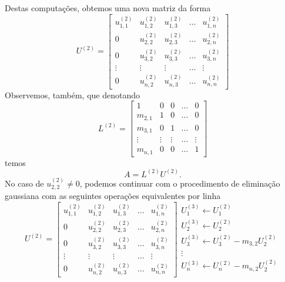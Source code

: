 Destas computações, obtemos uma nova matriz da forma
\begin{equation}
  U^{(2)} = \begin{bmatrix}
    u_{1,1}^{(2)} & u_{1,2}^{(2)} & u_{1,3}^{(2)} & \ldots & u_{1,n}^{(2)} \\
    0 & u_{2,2}^{(2)} & u_{2,3}^{(2)} & \ldots & u_{2,n}^{(2)} \\
    0 & u_{3,2}^{(2)} & u_{3,3}^{(2)} & \ldots & u_{3,n}^{(2)} \\
    \vdots & \vdots & \vdots & \ldots & \vdots \\
    0 & u_{n,2}^{(2)} & u_{n,3}^{(2)} & \ldots & u_{n,n}^{(2)}
  \end{bmatrix}  
\end{equation}
Observemos, também, que denotando
\begin{equation}
  L^{(2)} =
  \begin{bmatrix}
    1 & 0 & 0 & \ldots & 0\\
    m_{2,1} & 1 & 0 & \ldots & 0\\
    m_{3,1} & 0 & 1 & \ldots & 0\\
    \vdots & \vdots & \vdots & \ldots & \vdots\\
    m_{n,1} & 0 & 0 & \ldots & 1
  \end{bmatrix}
\end{equation}
temos
\begin{equation}
  A = L^{(2)}U^{(2)}.
\end{equation}
No caso de $u^{(2)}_{2,2}\neq 0$, podemos continuar com o procedimento de eliminação gaussiana com as seguintes operações equivalentes por linha
\begin{equation}
  U^{(2)} = \begin{bmatrix}
    u_{1,1}^{(2)} & u_{1,2}^{(2)} & u_{1,3}^{(2)} & \ldots & u_{1,n}^{(2)} \\
    0 & u_{2,2}^{(2)} & u_{2,3}^{(2)} & \ldots & u_{2,n}^{(2)} \\
    0 & u_{3,2}^{(2)} & u_{3,3}^{(2)} & \ldots & u_{3,n}^{(2)} \\
    \vdots & \vdots & \vdots & \ldots & \vdots \\
    0 & u_{n,2}^{(2)} & u_{n,3}^{(2)} & \ldots & u_{n,n}^{(2)}
  \end{bmatrix}  
  \begin{array}{l}
    U_1^{(3)}\leftarrow U_1^{(2)}\\
    U_2^{(3)}\leftarrow U_2^{(2)}\\
    U_3^{(3)} \leftarrow U_3^{(2)} - m_{3,2}U_2^{(2)}\\
    \vdots\\
    U_n^{(3)} \leftarrow U_n^{(2)} - m_{n,2}U_2^{(2)}\\
  \end{array}
\end{equation}
